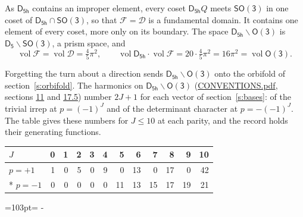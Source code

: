 \documentclass[10pt,a4paper]{article}
\newcommand{\needspace}[1]{\par\penalty-100\begingroup\dimen0=#1\relax\dimen2=\pagegoal
  \advance\dimen2-\pagetotal\ifdim\dimen0>\dimen2\relax\ifdim\dimen2>0pt\vfil\break\fi\fi
  \endgroup}
\numberwithin{equation}{section}
\newcommand{\grp}[1]{\mathsf{#1}}
\newcommand{\vol}{\operatorname{vol}}
\newcommand{\fcell}{\mathcal{D}}
\newcommand{\fdomain}{\mathcal{F}}
\begin{document}
\leavevmode\label{n:set.fundamental}As $\grp{D_{5h}}$ contains an improper element, every coset $\grp{D_{5h}}Q$ meets \href{SO3.pdf}{$\grp{SO(3)}$} in one coset of $\grp{D_{5h}} \cap \grp{SO(3)}$, so that $\fdomain = \fcell$ is a fundamental domain. It contains one element of every coset, more only on its boundary.
The space $\grp{D_{5h}}\backslash\grp{O(3)}$ is $\grp{D_{5}}\backslash\grp{SO(3)}$, a prism space, and
\begin{equation}\label{e:volume}\vol\fdomain = \vol\fcell = \tfrac{4}{5}\pi^2,\qquad \vol\grp{D_{5h}}\cdot\vol\fdomain = 20\cdot \tfrac{4}{5}\pi^2 = 16\pi^2 = \vol\grp{O(3)}.\end{equation}

Forgetting the turn about a direction sends $\grp{D_{5h}}\backslash\grp{O(3)}$ onto the orbifold of section~\ref{s:orbifold}.
The harmonics on $\grp{D_{5h}}\backslash\grp{O(3)}$ (\href{../../CONVENTIONS.pdf}{CONVENTIONS.pdf}, sections \href{../../CONVENTIONS.pdf\#conv.11}{11} and \href{../../CONVENTIONS.pdf\#conv.17.5}{17.5}) number $2J + 1$ for each vector of section~\ref{s:bases}: of the trivial irrep at $p = (-1)^J$ and of the determinant character at $p = -(-1)^J$. The table gives these numbers for $J \le 10$ at each parity, and the record holds their generating functions.
{\small\setlength{\tabcolsep}{4pt}\begin{longtable}{@{}lrrrrrrrrrrr@{}}\toprule
$J$ & 0 & 1 & 2 & 3 & 4 & 5 & 6 & 7 & 8 & 9 & 10\\\midrule\endhead
\bottomrule\endfoot\endlastfoot
$p = +1$ & 1 & 0 & 5 & 0 & 9 & 0 & 13 & 0 & 17 & 0 & 42\\*
$p = -1$ & 0 & 0 & 0 & 0 & 0 & 11 & 13 & 15 & 17 & 19 & 21\\
\bottomrule\end{longtable}}
\needspace{103pt}
\end{document}

